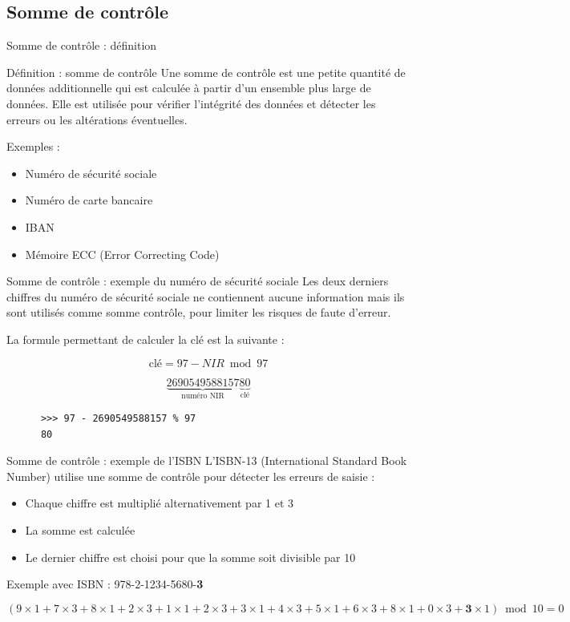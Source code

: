 \subsection*{Somme de contrôle}

\begin{frame}{Somme de contrôle : définition}
  \begin{block}{Définition : somme de contrôle}
    Une somme de contrôle est une petite quantité de données additionnelle qui est calculée à partir d'un ensemble plus large de données. Elle est utilisée pour vérifier l'intégrité des données et détecter les erreurs ou les altérations éventuelles.
  \end{block}

  Exemples :

  \begin{itemize}
    \item Numéro de sécurité sociale
    \item Numéro de carte bancaire
    \item IBAN
    \item Mémoire ECC (Error Correcting Code)
  \end{itemize}
\end{frame}

\begin{frame}[fragile]{Somme de contrôle : exemple du numéro de sécurité sociale}
  Les deux derniers chiffres du numéro de sécurité sociale ne contiennent aucune information mais ils sont utilisés comme somme contrôle, pour limiter les risques de faute d'erreur.

  La formule permettant de calculer la clé est la suivante :

  $$
    \textrm{clé} = 97 - NIR \bmod 97
  $$

  $$
    \underbrace{2 69 05 49 588 157}_{\textrm{numéro NIR}}\underbrace{80}_{\textrm{clé}}
  $$

  \begin{verbatim}
      >>> 97 - 2690549588157 % 97
      80
    \end{verbatim}
\end{frame}

\begin{frame}{Somme de contrôle : exemple de l'ISBN}
  L'ISBN-13 (International Standard Book Number) utilise une somme de contrôle pour détecter les erreurs de saisie :

  \begin{itemize}
    \item Chaque chiffre est multiplié alternativement par 1 et 3
    \item La somme est calculée
    \item Le dernier chiffre est choisi pour que la somme soit divisible par 10
  \end{itemize}

  Exemple avec ISBN : 978-2-1234-5680-\textbf{3}
  
  $$(9\times1 + 7\times3 + 8\times1 + 2\times3 + 1\times1 + 2\times3 + 3\times1 + 4\times3 + 5\times1 + 6\times3 + 8\times1 + 0\times3 + \textbf{3}\times1) \bmod 10 = 0$$
\end{frame}

